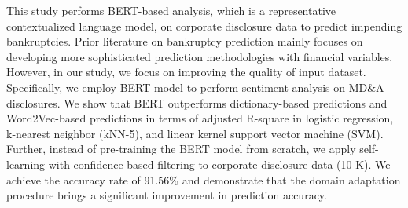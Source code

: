 This study performs BERT-based analysis, which is a representative contextualized language model, on corporate disclosure data to predict impending bankruptcies. Prior literature on bankruptcy prediction mainly focuses on developing more sophisticated prediction methodologies with financial variables. However, in our study, we focus on improving the quality of input dataset. Specifically, we employ BERT model to perform sentiment analysis on MD\&A disclosures. We show that BERT outperforms dictionary-based predictions and Word2Vec-based predictions in terms of adjusted R-square in logistic regression, k-nearest neighbor (kNN-5), and linear kernel support vector machine (SVM). Further, instead of pre-training the BERT model from scratch, we apply self-learning with confidence-based filtering to corporate disclosure data (10-K). We achieve the accuracy rate of 91.56\% and demonstrate that the domain adaptation procedure brings a significant improvement in prediction accuracy.
